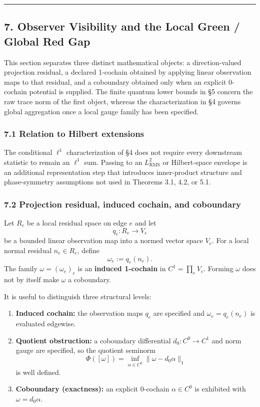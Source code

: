 \documentclass[
  11pt,
]{article}
\providecommand{\tightlist}{%
  \setlength{\itemsep}{0pt}\setlength{\parskip}{0pt}}
\providecommand{\tightlist}{%
  \setlength{\itemsep}{0pt}\setlength{\parskip}{0pt}}
\begin{document}
\begin{center}\rule{0.5\linewidth}{0.5pt}\end{center}

\subsection{7. Observer Visibility and the Local Green / Global Red Gap}\label{observer-visibility-and-the-local-green-global-red-gap}

This section separates three distinct mathematical objects: a direction-valued projection residual, a declared 1-cochain obtained by applying linear observation maps to that residual, and a coboundary obtained only when an explicit 0-cochain potential is supplied. The finite quantum lower bounds in §5 concern the raw trace norm of the first object, whereas the characterization in §4 governs global aggregation once a local gauge family has been specified.

\subsubsection{7.1 Relation to Hilbert extensions}\label{relation-to-hilbert-extensions}

The conditional \(\ell^1\) characterization of §4 does not require every downstream statistic to remain an \(\ell^1\) sum. Passing to an \(L^2_{\mathrm{RMS}}\) or Hilbert-space envelope is an additional representation step that introduces inner-product structure and phase-symmetry assumptions not used in Theorems 3.1, 4.2, or 5.1.

\subsubsection{7.2 Projection residual, induced cochain, and coboundary}\label{projection-residual-induced-cochain-and-coboundary}

Let \(R_e\) be a local residual space on edge \(e\) and let
\[
q_e:R_e\longrightarrow V_e
\]
be a bounded linear observation map into a normed vector space \(V_e\). For a local normal residual \(n_e \in R_e\), define
\[
\omega_e:=q_e(n_e).
\]
The family \(\omega=(\omega_e)_e\) is an \textbf{induced 1-cochain} in \(C^1=\prod_eV_e\). Forming \(\omega\) does not by itself make \(\omega\) a coboundary.

It is useful to distinguish three structural levels:

\begin{enumerate}
\def\labelenumi{\arabic{enumi}.}
\tightlist
\item
  \textbf{Induced cochain:} the observation maps \(q_e\) are specified and \(\omega_e=q_e(n_e)\) is evaluated edgewise.
\item
  \textbf{Quotient obstruction:} a coboundary differential \(d_0:C^0\to C^1\) and norm gauge are specified, so the quotient seminorm
  \[
  \Phi([\omega])=\inf_{\alpha\in C^0}\lVert\omega-d_0\alpha\rVert_1
  \]
  is well defined.
\item
  \textbf{Coboundary (exactness):} an explicit 0-cochain \(\alpha\in C^0\) is exhibited with \(\omega=d_0\alpha\).
\end{enumerate}
\end{document}
